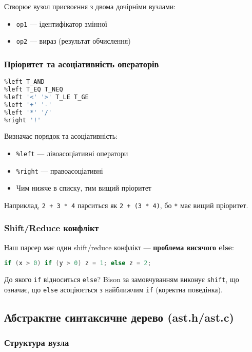 \documentclass[12pt,a4paper]{article}
\begin{document}
Створює вузол присвоєння з двома дочірніми вузлами:
\begin{itemize}
    \item \texttt{op1} --- ідентифікатор змінної
    \item \texttt{op2} --- вираз (результат обчислення)
\end{itemize}

\subsubsection{Пріоритет та асоціативність операторів}

\begin{lstlisting}[language=C]
%left T_OR
%left T_AND
%left T_EQ T_NEQ
%left '<' '>' T_LE T_GE
%left '+' '-'
%left '*' '/'
%right '!' 
\end{lstlisting}

Визначає порядок та асоціативність:
\begin{itemize}
    \item \texttt{\%left} --- лівоасоціативні оператори
    \item \texttt{\%right} --- правоасоціативні
    \item Чим нижче в списку, тим вищий пріоритет
\end{itemize}

Наприклад, \texttt{2 + 3 * 4} парситься як \texttt{2 + (3 * 4)}, бо \texttt{*} має вищий пріоритет.

\subsubsection{Shift/Reduce конфлікт}

Наш парсер має один shift/reduce конфлікт --- \textbf{проблема висячого else}:

\begin{lstlisting}[language=C]
if (x > 0) if (y > 0) z = 1; else z = 2;
\end{lstlisting}

До якого \texttt{if} відноситься \texttt{else}? Bison за замовчуванням виконує \texttt{shift}, що означає, що \texttt{else} асоціюється з найближчим \texttt{if} (коректна поведінка).

\subsection{Абстрактне синтаксичне дерево (ast.h/ast.c)}

\subsubsection{Структура вузла}
\end{document}
